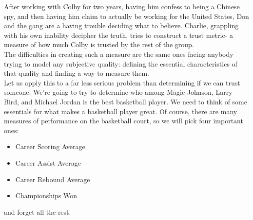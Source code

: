 
After working with Colby for two years, having him confess to being a Chinese spy, and then having him claim to actually be working for the United States, Don and the gang are a having trouble deciding what to believe. Charlie, grappling with his own inability decipher the truth, tries to construct a trust metric- a measure of how much Colby is trusted by the rest of the group. \\

The difficulties in creating such a measure are the same ones facing anybody trying to model any subjective quality: defining the essential characteristics of that quality and finding a way to measure them. \\

Let us apply this to a far less serious problem than determining if we can trust someone. We're going to try to determine who among Magic Johnson, Larry Bird, and Michael Jordan is the best basketball player. We need to think of some essentials for what makes a basketball player great. Of course, there are many measures of performance on the basketball court, so we will pick four important ones:
\begin{itemize}
\item Career Scoring Average
\item Career Assist Average
\item Career Rebound Average
\item Championships Won
\end{itemize}
and forget all the rest. \\

